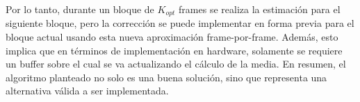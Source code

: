 Por lo tanto, durante un bloque de $K_{opt}$ frames se realiza la estimación para el siguiente bloque, pero la corrección se puede implementar en forma previa para el bloque actual usando esta nueva aproximación frame-por-frame. Además, esto implica que en términos de implementación en hardware, solamente se requiere un buffer sobre el cual se va actualizando el cálculo de la media. En resumen, el algoritmo planteado no solo es una buena solución, sino que representa una alternativa válida a ser implementada.
% 
% 
% 
% 
